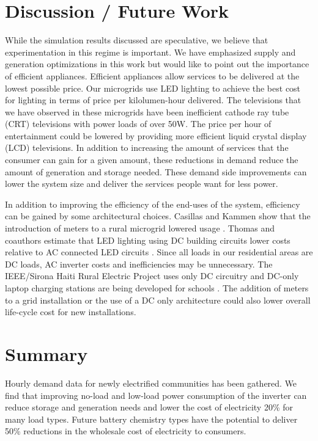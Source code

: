 \documentclass[conference]{IEEEtran}
\begin{document}
\section{Discussion / Future Work}
While the simulation results discussed are speculative,
we believe that experimentation in this regime is important.
We have emphasized supply and generation optimizations in
this work but would like to point out the importance of
efficient appliances.
Efficient appliances allow services to be delivered at the
lowest possible price.
Our microgrids use LED lighting to achieve the best cost for
lighting in terms of price per kilolumen-hour delivered.
The televisions that we have observed in these microgrids
have been inefficient cathode ray tube (CRT) televisions
with power loads of over 50W.
The price per hour of entertainment could be lowered by providing
more efficient liquid crystal display (LCD) televisions.
In addition to increasing the amount of services that the consumer
can gain for a given amount, these reductions in demand
reduce the amount of generation and storage needed.
These demand side improvements can lower the system size and
deliver the services people want for less power.

In addition to improving the efficiency of the end-uses of
the system, efficiency can be gained by some architectural
choices.
Casillas and Kammen show that the introduction of meters
to a rural microgrid lowered usage \cite{Casillas-2010}.
Thomas and coauthors estimate that LED lighting using DC
building circuits lower costs relative to AC connected
LED circuits \cite{EdisonRevisited}.
Since all loads in our residential areas are DC loads,
AC inverter costs and inefficiencies may be unnecessary.
The IEEE/Sirona Haiti Rural Electric Project
uses only
DC circuitry and DC-only laptop charging stations
are being developed for schools \cite{Hosman}.
The addition of meters to a grid installation or the use of a
DC only architecture could also lower overall life-cycle cost
for new installations.


\section{Summary}
Hourly demand data for newly electrified communities has been gathered.
We find that improving no-load and low-load power consumption of the
inverter can reduce storage and generation needs and lower the cost
of electricity 20\% for many load types.
Future battery chemistry types have the potential to deliver 50\%
reductions in the wholesale cost of electricity to consumers.
\end{document}
